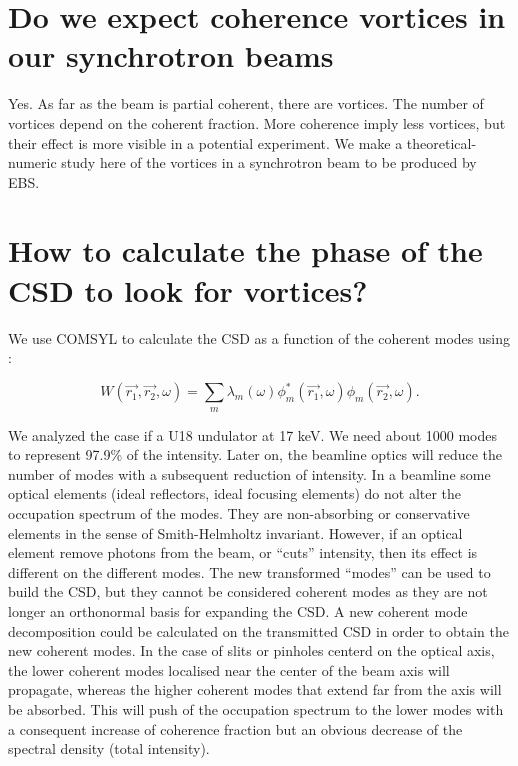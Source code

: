 \documentclass[a4paper,10pt]{article}
\begin{document}
 
\section{Do we expect coherence vortices in our synchrotron beams}

Yes. As far as the beam is partial coherent, there are vortices. The number of vortices depend on the coherent fraction. More coherence imply less vortices, but their effect is more visible in a potential experiment. We make a theoretical-numeric study here of the vortices in a synchrotron beam to be produced by EBS.


\section{How to calculate the phase of the CSD to look for vortices?}

We use COMSYL to calculate the CSD as a function of the coherent modes using :


\begin{equation}
W(\vec{r_1}, \vec{r_2}, \omega)
=
\sum_m
\lambda_m(\omega)
\phi_m^*(\vec{r_1},\omega)
\phi_m(\vec{r_2}, \omega).
\end{equation}

We analyzed the case if a U18 undulator at 17 keV. We need about 1000 modes to represent 97.9\% of the intensity. Later on, the beamline optics will reduce the number of modes  with a subsequent reduction of intensity. In a beamline some optical elements (ideal reflectors, ideal focusing elements) do not alter the occupation spectrum of the modes. They are non-absorbing or conservative elements in the sense of Smith-Helmholtz invariant. However, if an optical element remove photons from the beam, or ``cuts'' intensity, then its effect is different on the different modes. The new transformed ``modes'' can be used to build the CSD, but they cannot be considered coherent modes as they are not longer an orthonormal basis for expanding the CSD. A new coherent mode decomposition could be calculated on the transmitted CSD in order to obtain the new coherent modes. In the case of slits or pinholes centerd on the optical axis, the lower coherent modes localised near the center of the beam axis will propagate, whereas the higher coherent modes that extend far from the axis will be absorbed. This will push of the occupation spectrum to the lower modes with a consequent increase of coherence fraction but an obvious decrease of the spectral density (total intensity).     
\end{document}
